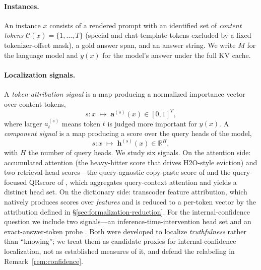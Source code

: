 \documentclass[11pt]{article}
\begin{document}
\paragraph{Instances.}
An instance $x$ consists of a rendered prompt with an identified set of
\emph{content tokens} $\mathcal{C}(x) = \{1,\dots,T\}$ (special and
chat-template tokens excluded by a fixed tokenizer-offset mask), a gold
answer span, and an answer string. We write $M$ for the language model and
$y(x)$ for the model's answer under the full KV cache.

\paragraph{Localization signals.}
A \emph{token-attribution signal} is a map producing a normalized importance
vector over content tokens,
\[
  s : x \;\longmapsto\; \mathbf{a}^{(s)}(x) \in [0,1]^{T},
\]
where larger $a^{(s)}_t$ means token $t$ is judged more important for
$y(x)$. A \emph{component signal} is a map producing a score over the query
heads of the model,
\[
  s : x \;\longmapsto\; \mathbf{h}^{(s)}(x) \in \mathbb{R}^{H},
\]
with $H$ the number of query heads. We study six signals. On the attention
side: accumulated attention (the heavy-hitter score that drives H2O-style
eviction) and two retrieval-head scores---the query-agnostic copy-paste
score of \citet{wu2024} and the query-focused QRscore of \citet{zhang2025},
which aggregates query-context attention and yields a distinct head set. On
the dictionary side: transcoder feature attribution, which natively produces
scores over \emph{features} and is reduced to a per-token vector by the
attribution defined in \S\ref{sec:formalization-reduction}. For the
internal-confidence question we include two signals---an
inference-time-intervention head set \citep{li2023iti} and an
exact-answer-token probe \citep{orgad2024}. Both were developed to localize
\emph{truthfulness} rather than ``knowing''; we treat them as candidate
proxies for internal-confidence localization, not as established measures of
it, and defend the relabeling in Remark~\ref{rem:confidence}.
\end{document}
